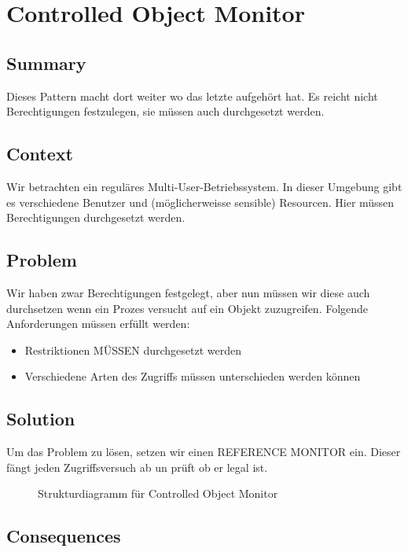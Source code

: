 \chapter{Controlled Object Monitor}

\section{Summary}
Dieses Pattern macht dort weiter wo das letzte aufgehört hat. Es reicht nicht Berechtigungen festzulegen, sie müssen auch durchgesetzt werden.

\section{Context}
Wir betrachten ein reguläres Multi-User-Betriebssystem. In dieser Umgebung gibt es verschiedene Benutzer und (möglicherweisse sensible) Resourcen. Hier müssen Berechtigungen durchgesetzt werden.

\section{Problem}
Wir haben zwar Berechtigungen festgelegt, aber nun müssen wir diese auch durchsetzen wenn ein Prozes versucht auf ein Objekt zuzugreifen. Folgende Anforderungen müssen erfüllt werden:
\begin{itemize}
  \item Restriktionen MÜSSEN durchgesetzt werden
  \item Verschiedene Arten des Zugriffs müssen unterschieden werden können
\end{itemize}

\section{Solution}
Um das Problem zu lösen, setzen wir einen REFERENCE MONITOR ein. Dieser fängt jeden Zugriffsversuch ab un prüft ob er legal ist.

\begin{figure}[H]
  \centering
  
  \caption{Strukturdiagramm f\"ur Controlled Object Monitor}
\end{figure}

\section{Consequences}
\begin{itemize}
\end{itemize}

